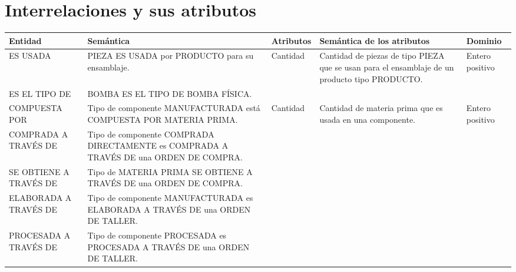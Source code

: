 \documentclass[]{report}
\begin{document}
	\section*{\centering Interrelaciones y sus atributos}
	\begin{center}
		\begin{tabular}{ | p{2.5cm} | p{5cm} | p{2cm} | p{4.5cm} | p{3cm}|}
		
			\hline
			Entidad & Semántica & Atributos & Semántica de los atributos & Dominio \\ \hline
		
			\hline
			ES USADA & PIEZA ES USADA por	 PRODUCTO para su ensamblaje. &
			Cantidad & Cantidad de piezas de tipo PIEZA que se usan para el ensamblaje de un producto tipo PRODUCTO. & Entero positivo\\ \cline{3-5}
			\hline
			
			
			ES EL TIPO DE & BOMBA ES EL TIPO DE BOMBA FÍSICA. & & & \\ 
			\hline
			
			
			COMPUESTA POR & Tipo de componente MANUFACTURADA está COMPUESTA POR MATERIA PRIMA. &
			Cantidad & Cantidad de materia prima que es usada en una componente. & Entero positivo\\ \cline{3-5}
			\hline
			
			
			COMPRADA A TRAVÉS DE & Tipo de componente COMPRADA DIRECTAMENTE es COMPRADA A TRAVÉS DE una ORDEN DE COMPRA. &  &  & \\ \cline{3-5}
			\hline
			
			SE OBTIENE A TRAVÉS DE & Tipo de MATERIA PRIMA SE OBTIENE A TRAVÉS DE una ORDEN DE COMPRA. &  &  & \\ \cline{3-5}
			\hline
			ELABORADA A TRAVÉS DE & Tipo de componente MANUFACTURADA es ELABORADA A TRAVÉS DE una ORDEN DE TALLER. &  &  & \\ \cline{3-5}
			\hline
			
			PROCESADA A TRAVÉS DE & Tipo de componente PROCESADA es PROCESADA A TRAVÉS DE una ORDEN DE TALLER. &  &  & \\ \cline{3-5}
			\hline
			
		\end{tabular}
	\end{center}
\end{document}

